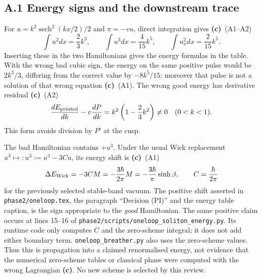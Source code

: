 \documentclass[11pt,a4paper]{article}
\newcommand{\C}{\textsf{\textbf{(c)}}}
\newcommand{\file}[1]{\nolinkurl{#1}}
\begin{document}
\subsection*{A.1 Energy signs and the downstream trace}
For $u=k^2\operatorname{sech}^2(kx/2)/2$ and $\pi=-vu$, direct integration gives
\C\ (A1--A2)
\[
 \int u^2dx=\frac23k^3,\qquad \int u^3dx=\frac4{15}k^5,
 \qquad \int u_x^2dx=\frac2{15}k^5.
\]
Inserting these in the two Hamiltonians gives the energy formulas in the
table. With the wrong bad cubic sign, the energy on the same positive pulse
would be $2k^3/3$, differing from the correct value by $-8k^5/15$; moreover
that pulse is not a solution of that wrong equation \C\ (A1).
The wrong good energy has derivative residual
\C\ (A2)
\[
 \frac{dE_{\rm printed}}{dk}-v\frac{dP}{dk}
 =k^2\left(1-\frac23k^2\right)\ne0\quad(0<k<1).
\]
This form avoids division by $P'$ at the cusp.

The bad Hamiltonian contains $+u^3$. Under the usual Wick replacement
$u^3\mapsto:u^3:=u^3-3Cu$, its energy shift is
\C\ (A1)
\[
 \Delta E_{\rm Wick}=-3CM
 =-\frac{3\hbar}{2\pi}M
 =-\frac{3\hbar}{\pi}\sinh\beta,
 \qquad C=\frac{\hbar}{2\pi}
\]
for the previously selected stable-band vacuum. The positive shift asserted
in \file{phase2/oneloop.tex}, the paragraph ``Decision (PI)'' and the energy
table caption, is the sign appropriate to the \emph{good} Hamiltonian.
The same positive claim occurs at lines 15--16 of
\file{phase2/scripts/oneloop_soliton_energy.py}. Its runtime code only computes
$C$ and the zero-scheme integral; it does not add either boundary term.
\file{oneloop_breather.py} also uses the zero-scheme values.
Thus this is propagation into a claimed renormalised energy, not evidence
that the numerical zero-scheme tables or classical phase were computed with
the wrong Lagrangian \C. No new scheme is selected by this review.
\end{document}
